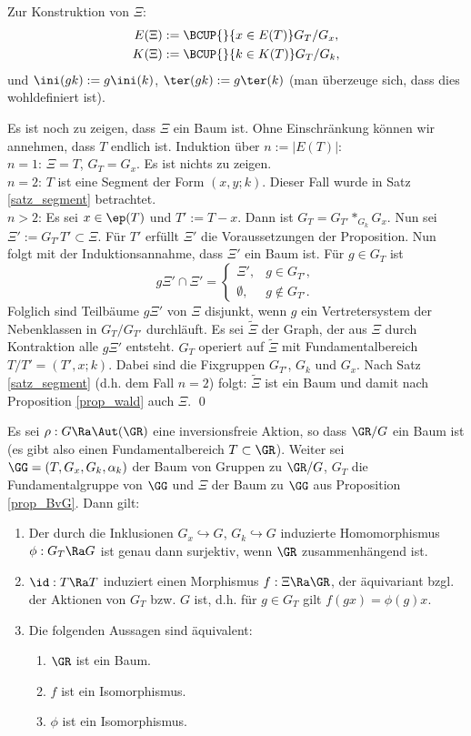 \bew Zur Konstruktion von $\Xi$:
\begin{align*}
E(\Xi) &:= \BCUP{}{x\in E(T)} G_T/G_x, \\
K(\Xi) &:= \BCUP{}{k\in K(T)} G_T/G_k,
\end{align*}
und $\ini(gk):=g \ini(k)$, $\ter(gk):=g \ter(k)$ (man überzeuge sich,
dass dies wohldefiniert ist).

Es ist noch zu zeigen, dass $\Xi$ ein Baum ist. Ohne Einschränkung
können wir annehmen, dass $T$ endlich ist. Induktion über
$n:=|E(T)|$:\\
$n=1$: $\Xi=T$, $G_T=G_x$. Es ist nichts zu zeigen.\\
$n=2$: $T$ ist eine Segment der Form $(x,y;k)$. Dieser Fall wurde
in Satz \ref{satz_segment} betrachtet.\\
$n>2$: Es sei $x\in \ep(T)$ und $T':=T-x$. Dann ist
$G_T=G_{T'}*_{G_k} G_x$. Nun sei $\Xi' := G_{T'} T' \subset \Xi$.
Für $T'$ erfüllt $\Xi'$ die Voraussetzungen der Proposition.
Nun folgt mit der Induktionsannahme, dass $\Xi'$ ein Baum ist.
Für $g\in G_T$ ist
\[
g\Xi' \cap \Xi' =
\left\{
\begin{matrix}
\Xi', &  g\in G_{T'}, \\
\emptyset, & g\not\in G_{T'}.
\end{matrix}\right.
\]
Folglich sind Teilbäume $g\Xi'$ von $\Xi$ disjunkt, wenn $g$ ein
Vertretersystem der Nebenklassen in $G_T/G_{T'}$ durchläuft.
Es sei $\tilde{\Xi}$ der Graph, der aus $\Xi$ durch
Kontraktion alle $g \Xi'$ entsteht. $G_T$ operiert auf $\tilde{\Xi}$
mit Fundamentalbereich $T/T'=(T',x;k)$.
Dabei sind die Fixgruppen $G_{T'}$, $G_k$ und $G_x$.
Nach Satz \ref{satz_segment} (d.h. dem Fall $n=2$) folgt:
$\tilde{\Xi}$ ist ein Baum und damit nach
Proposition \ref{prop_wald} auch $\Xi$.
\qed

\PROP Es sei $\rho:G\Ra\Aut(\GR)$ eine inversionsfreie Aktion,
so dass $\GR/G$ ein Baum ist (es gibt also einen Fundamentalbereich
$T\subset \GR$).
Weiter sei $\GG=(T,G_x,G_k,\alpha_k)$ der Baum von Gruppen zu
$\GR/G$, $G_T$ die Fundamentalgruppe von $\GG$ und $\Xi$ der
Baum zu $\GG$ aus Proposition \ref{prop_BvG}. Dann gilt:
\begin{enumerate}
\item Der durch die Inklusionen $G_x \hookrightarrow G$,
$G_k \hookrightarrow G$ induzierte Homomorphismus
$\phi:G_T \Ra G$ ist genau dann surjektiv, wenn $\GR$
zusammenhängend ist.
\item $\id:T\Ra T$ induziert einen Morphismus $f:\Xi\Ra\GR$,
der äquivariant bzgl. der Aktionen von
$G_T$ bzw. $G$ ist, d.h. für $g\in G_T$ gilt
$f(gx)=\phi(g)x$.
\item Die folgenden Aussagen sind äquivalent:
\begin{enumerate}
\item $\GR$ ist ein Baum.
\item $f$ ist ein Isomorphismus.
\item $\phi$ ist ein Isomorphismus.
\end{enumerate}
\end{enumerate}

